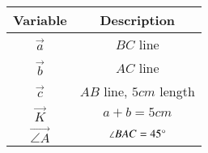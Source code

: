 \begin{tabular}[12pt]{ |c| c|}
    \hline
    \textbf{Variable} & \textbf{Description}\\ 
    \hline
	$\vec{a}$ & $BC$ line\\
   \hline
	$\vec{b}$ & $AC$ line\\
   \hline
	$\vec{c}$ & $AB$ line, $5cm$ length\\
   \hline
	$\vec{K}$ & $a+b=5cm$\\
	\hline
	$\vec{\angle{A}}$ & $\angle{BAC}=45{\degree}$\\
	\hline

    \end{tabular}

